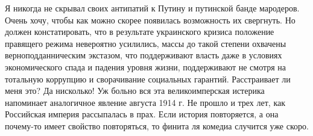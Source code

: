 Я никогда не скрывал своих антипатий к Путину и путинской банде мародеров.
Очень хочу, чтобы как можно скорее появилась возможность их свергнуть. Но
должен констатировать, что в результате украинского кризиса положение правящего
режима невероятно усилились, массы до такой степени охвачены
верноподданническим экстазом, что поддерживают власть  даже в условиях
экономического спада и падения уровня жизни, поддерживают не смотря на
тотальную коррупцию и сворачивание социальных гарантий.  Расстраивает ли меня
это? Да нисколько! Уж больно вся эта великоимперская истерика напоминает
аналогичное явление августа 1914 г. Не прошло и трех лет, как Российская
империя рассыпалась в прах. Если история повторяется, а она почему-то имеет
свойство повторяться, то  финита ля комедиа случится уже скоро.
